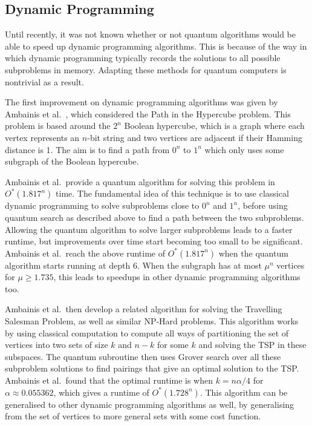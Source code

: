 \subsection{Dynamic Programming}

Until recently, it was not known whether or not quantum algorithms would be able to speed up dynamic programming algorithms. This is because of the way in which dynamic programming typically records the solutions to all possible subproblems in memory. Adapting these methods for quantum computers is nontrivial as a result.

The first improvement on dynamic programming algorithms was given by Ambainis et al.\ \cite{ambainis2018}, which considered the Path in the Hypercube problem. This problem is based around the $2^n$ Boolean hypercube, which is a graph where each vertex represents an $n$-bit string and two vertices are adjacent if their Hamming distance is 1. The aim is to find a path from $0^n$ to $1^n$ which only uses some subgraph of the Boolean hypercube.

Ambainis et al.\ provide a quantum algorithm for solving this problem in $O^*(1.817^n)$ time. The fundamental idea of this technique is to use classical dynamic programming to solve subproblems close to $0^n$ and $1^n$, before using quantum search as described above to find a path between the two subproblems. Allowing the quantum algorithm to solve larger subproblems leads to a faster runtime, but improvements over time start becoming too small to be significant. Ambainis et al.\ reach the above runtime of $O^*(1.817^n)$ when the quantum algorithm starts running at depth $6$. When the subgraph has at most $\mu^n$ vertices for $\mu \geq 1.735$, this leads to speedups in other dynamic programming algorithms too.

Ambainis et al.\ then develop a related algorithm for solving the Travelling Salesman Problem, as well as similar NP-Hard problems. This algorithm works by using classical computation to compute all ways of partitioning the set of vertices into two sets of size $k$ and $n-k$ for some $k$ and solving the TSP in these subspaces. The quantum subroutine then uses Grover search over all these subproblem solutions to find pairings that give an optimal solution to the TSP. Ambainis et al.\ found that the optimal runtime is when $k=n\alpha/4$ for $\alpha\approx0.055362$, which gives a runtime of $O^*(1.728^n)$. This algorithm can be generalised to other dynamic programming algorithms as well, by generalising from the set of vertices to more general sets with some cost function.


